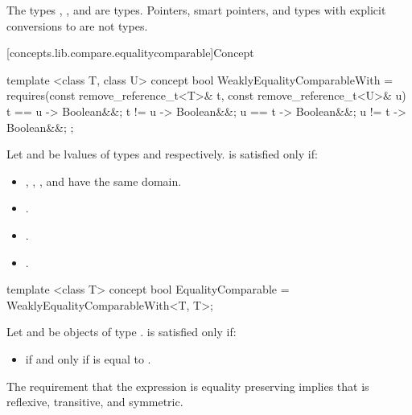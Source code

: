 \pnum \enterexample The types , , and
 are  types.
Pointers, smart pointers, and types with explicit conversions to  are
not  types.\exitexample

[concepts.lib.compare.equalitycomparable]{Concept }

%
\begin{itemdecl}
template <class T, class U>
concept bool WeaklyEqualityComparableWith =
  requires(const remove_reference_t<T>& t,
           const remove_reference_t<U>& u) {
    { t == u } -> Boolean&&;
    { t != u } -> Boolean&&;
    { u == t } -> Boolean&&;
    { u != t } -> Boolean&&;
  };
\end{itemdecl}

\begin{itemdescr}
\pnum
Let  and  be  lvalues of types
 and  respectively.
 is satisfied only if:
\begin{itemize}
\item {}, , , and 
      have the same domain.
\item {}.
\item {}.
\item {}.
\end{itemize}
\end{itemdescr}

%
\begin{itemdecl}
template <class T>
concept bool EqualityComparable = WeaklyEqualityComparableWith<T, T>;
\end{itemdecl}

\begin{itemdescr}
\pnum
Let  and  be objects of type .
 is satisfied only if:

\begin{itemize}
\item {} if and only if  is equal to .
\end{itemize}

\pnum
\enternote The requirement that the expression  is equality preserving
implies that \tcode{==} is reflexive, transitive, and symmetric.\exitnote
\end{itemdescr}


